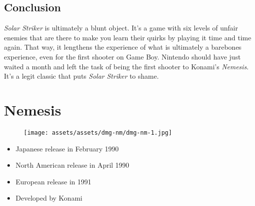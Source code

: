 \documentclass{book}
\let\oldcenter\center
\let\oldendcenter\endcenter
\renewenvironment{center}{\setlength\topsep{0pt}\oldcenter}{\oldendcenter}
\begin{document}
\FloatBarrier\needspace{10mm}\section*{Conclusion}\nopagebreak[4]

\emph{Solar Striker} is ultimately a blunt object. It’s a game with six levels of unfair enemies that are there to make you learn their quirks by playing it time and time again. That way, it lengthens the experience of what is ultimately a barebones experience, even for the first shooter on Game Boy. Nintendo should have just waited a month and left the task of being the first shooter to Konami’s \emph{Nemesis}. It’s a legit classic that puts \emph{Solar Striker} to shame.

\begin{center}
\quad\vspace{4pt}
\quad\vspace{4pt}
\quad\vspace{4pt}
\end{center}



\begingroup \chapter*{Nemesis} \endgroup
\begin{figure}[H]
\vskip 4pt
\centering
\texttt{[image: assets/assets/dmg-nm/dmg-nm-1.jpg]}\end{figure}
\begin{itemize} [nosep]




\item Japanese release in February 1990







\item North American release in April 1990







\item European release in 1991












\item Developed by Konami

\end{itemize}\noindent
\end{document}
